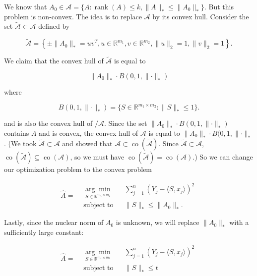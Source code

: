 \begin{example}
We know that \(A_0 \in \mathcal{A} = \{A: \operatorname{rank}(A) \leq k, \lVert A \rVert_* \leq \lVert A_0 \rVert_* \}\). But this problem is non-convex. The idea is to replace \(\mathcal{A}\) by its convex hull. Consider the set \(\tilde{\mathcal{A}} \subset \mathcal{A}\) defined by

\[
\tilde{\mathcal{A}} = \left\{ \pm \lVert A_0 \rVert_* = uv^T, u \in \mathbb{R}^{m_1}, v \in \mathbb{R}^{m_2}, \lVert u \rVert_2 = 1, \lVert v \rVert_2 = 1 \right\}.
\]

We claim that the convex hull of \(\tilde{\mathcal{A}}\) is equal to 

\[
\lVert A_0 \rVert_* \cdot B(0, 1, \lVert \cdot \rVert_*)
\]

where

\[
B(0, 1, \lVert \cdot \rVert_*)  = \{S \in \mathbb{R}^{m_1 \times m_2}: \lVert S \rVert_* \leq 1\}.
\]

and is also the convex hull of \(\mathcal{/A}\). Since the set \(\lVert A_0 \rVert_* \cdot B(0, 1, \lVert \cdot \rVert_*)\) contains \(A\) and is convex, the convex hull of \(\mathcal{A}\) is equal to \(\lVert A_0 \rVert_* \cdot B(0, 1, \lVert \cdot \rVert_*\). (We took \(\tilde{\mathcal{A}} \subset \mathcal{A}\) and showed that \(\mathcal{A} \subset \operatorname{co}(\tilde{\mathcal{A}})\). Since \(\tilde{\mathcal{A}} \subset \mathcal{A}\), \(\operatorname{co}(\tilde{\mathcal{A}}) \subseteq \operatorname{co}(\mathcal{A})\), so we must have \(\operatorname{co}(\tilde{\mathcal{A}}) =\operatorname{co}(\mathcal{A})\).)  So we can change our optimization problem to the convex problem

\[
\hat{A} = \begin{aligned}
& \underset{S \in \mathbb{R}^{m_1 \times m_2}}{\arg \min} 
& & \sum_{j=1}^n (Y_j - \langle S, x_j \rangle )^2 \\
& \text{subject to}
& & \lVert S \rVert_* \leq \lVert A_0 \rVert_*.
\end{aligned}
\] 

Lastly, since the nuclear norm of \(A_0\) is unknown, we will replace \( \lVert A_0 \rVert_*\) with a sufficiently large constant:

\[
\hat{A} = \begin{aligned}
& \underset{S \in \mathbb{R}^{m_1 \times m_2}}{\arg \min} 
& & \sum_{j=1}^n (Y_j - \langle S, x_j \rangle )^2 \\
& \text{subject to}
& & \lVert S \rVert_* \leq t
\end{aligned}
\] 


\end{example}
